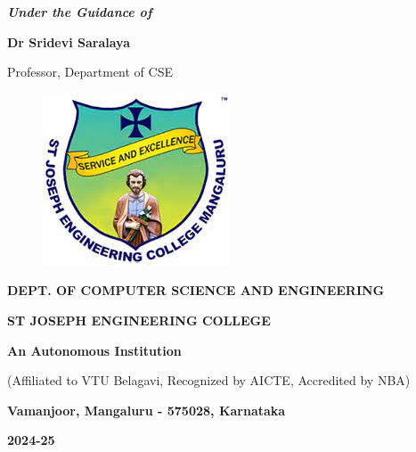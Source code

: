 \documentclass[12pt,a4paper]{report}
\begin{document}
\begin{center}
\vspace{12pt}
\textit{\textbf{Under the Guidance of}}
\par
\vspace{6pt}
\textbf{Dr Sridevi Saralaya}
\par
\vspace{2pt}
\normalsize { Professor, Department of CSE }
\par
\begin{figure}[hbtp]
\centering
\includegraphics[scale=0.6]{./pic/sjeclogo}
\end{figure}
\large \textbf{DEPT. OF COMPUTER SCIENCE AND ENGINEERING}
\par \Large \textbf{ST JOSEPH ENGINEERING COLLEGE}
\par 
\textbf{An Autonomous Institution}
\par
{\large{(Affiliated to VTU Belagavi, Recognized by AICTE, Accredited by NBA)}}
\par
\vspace{3pt}
{\large \textbf{Vamanjoor, Mangaluru - 575028, Karnataka}}
\par 
\vspace{12pt}
{\Large \textbf{2024-25}}
\end{center}

\newpage


\end{document}
